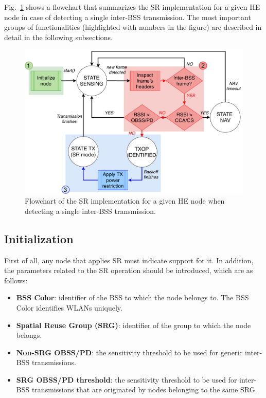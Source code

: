 \documentclass[conference]{IEEEtran}
\begin{document}
	Fig.~\ref{fig:implementation_overview} shows a flowchart that summarizes the SR implementation for a given HE node in case of detecting a single inter-BSS transmission. The most important groups of functionalities (highlighted with numbers in the figure) are described in detail in the following subsections.
	
	\begin{figure}[h!!!!]
		\centering
		\includegraphics[width=\columnwidth]{implementation_overview}
		\caption{Flowchart of the SR implementation for a given HE node when detecting a single inter-BSS transmission.}
		\label{fig:implementation_overview}
	\end{figure}
	
	\subsection{Initialization}
	First of all, any node that applies SR must indicate support for it. In addition, the parameters related to the SR operation should be introduced, which are as follows:
	\begin{itemize}
		\item \textbf{BSS Color}: identifier of the BSS to which the node belongs to. The BSS Color identifies WLANs uniquely.
		\item \textbf{Spatial Reuse Group (SRG)}: identifier of the group to which the node belongs.
		\item \textbf{Non-SRG OBSS/PD}: the sensitivity threshold to be used for generic inter-BSS transmissions.
		\item \textbf{SRG OBSS/PD threshold}: the sensitivity threshold to be used for inter-BSS transmissions that are originated by nodes belonging to the same SRG.
	\end{itemize}
	
\end{document}
